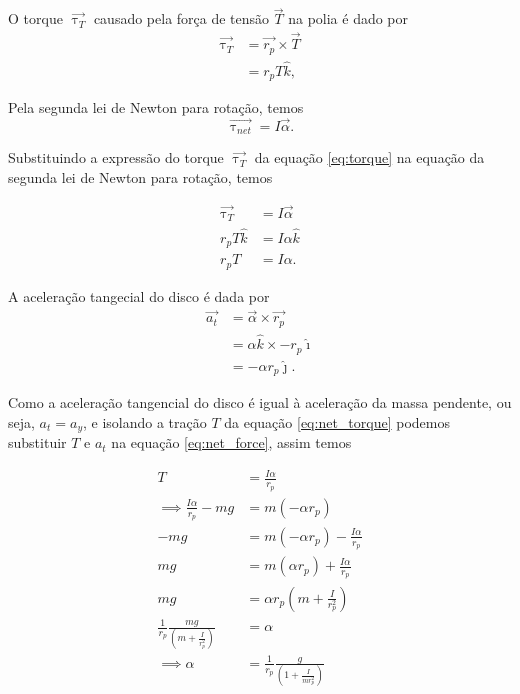 \documentclass[12pt,a4paper]{article}
\begin{document}
O torque $\vec{\uptau_T}$ causado pela força de tensão $\vec{T}$ na polia é dado por
\begin{align}
    \vec{\uptau_T} &= \vec{r_p} \times \vec{T} \nonumber \\
    &= r_p T \hat{k}, \label{eq:torque}
\end{align}

Pela segunda lei de Newton para rotação, temos
\begin{equation}
    \vec{\uptau_{net}} = I \vec{\alpha}.
\end{equation}

Substituindo a expressão do torque $\vec{\uptau_T}$ da equação \eqref{eq:torque} na equação da segunda lei de Newton para rotação, temos

\begin{align}
    \vec{\uptau_T} &= I \vec{\alpha} \nonumber \\
    r_p T \hat{k} &= I \alpha \hat{k} \nonumber \\
    r_p T &= I \alpha. \label{eq:net_torque}
\end{align}

A aceleração tangecial do disco é dada por
\begin{align}
    \vec{a_t} &= \vec{\alpha} \times \vec{r_p} \nonumber \\
    &= \alpha \hat{k} \times -r_p \hat{\imath} \nonumber \\
    &= -\alpha r_p \hat{\jmath}. \label{eq:tangential_acceleration}
\end{align}

Como a aceleração tangencial do disco é igual à aceleração da massa pendente, ou seja, $a_t = a_y$, e isolando a tração $T$ da equação \eqref{eq:net_torque} podemos substituir $T$ e $a_t$ na equação \eqref{eq:net_force}, assim temos

\begin{align}
    T &= \frac{I \alpha}{r_p} \nonumber \\
    \implies \frac{I \alpha}{r_p} - mg &= m (-\alpha r_p) \nonumber \\
    - mg &= m (-\alpha r_p) - \frac{I \alpha}{r_p}  \nonumber \\
    mg &= m (\alpha r_p) + \frac{I \alpha}{r_p}  \nonumber \\
    mg &= \alpha r_p \left(m + \frac{I}{r_p^2}\right) \nonumber \\
    \frac{1}{r_p}\frac{mg}{\left(m + \frac{I}{r_p^2}\right)} &= \alpha \nonumber \\
    \implies \alpha &= \frac{1}{r_p}\frac{g}{\left(1 + \frac{I}{mr_p^2}\right)} \label{eq:angular_acceleration}
\end{align}
\end{document}
